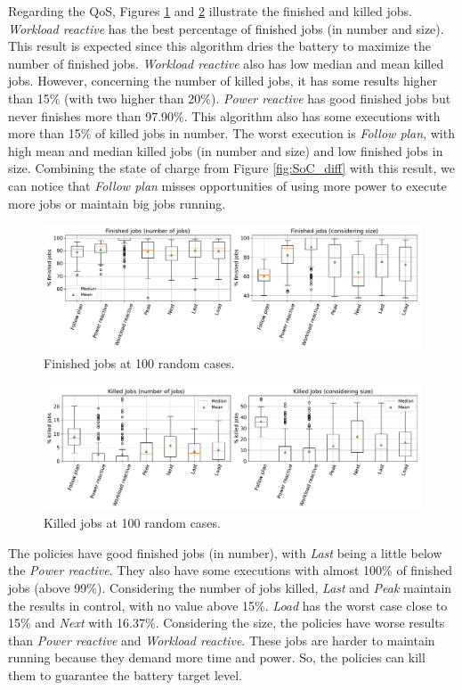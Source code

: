 Regarding the QoS, Figures \ref{fig:finished_diff} and \ref{fig:killed_diff} illustrate the finished and killed jobs. \emph{Workload reactive} has the best percentage of finished jobs (in number and size). This result is expected since this algorithm dries the battery to maximize the number of finished jobs. \emph{Workload reactive} also has low median and mean killed jobs. However, concerning the number of killed jobs, it has some results higher than 15\% (with two higher than 20\%). \emph{Power reactive} has good finished jobs but never finishes more than 97.90\%. This algorithm also has some executions with more than 15\% of killed jobs in number. The worst execution is \emph{Follow plan}, with high mean and median killed jobs (in number and size) and low finished jobs in size. Combining the state of charge from Figure \ref{fig:SoC_diff} with this result, we can notice that \emph{Follow plan} misses opportunities of using more power to execute more jobs or maintain big jobs running.

\begin{figure}[!htb]
    \centering
    \includegraphics[scale=0.38]{Images/Compensations/finished_diff.pdf}
    \caption{Finished jobs at 100 random cases.}
    \label{fig:finished_diff}
\end{figure}

\begin{figure}[!htb]
    \centering
    \includegraphics[scale=0.38]{Images/Compensations/killed_diff.pdf}
    \caption{Killed jobs at 100 random cases.}
    \label{fig:killed_diff}
\end{figure}

The policies have good finished jobs (in number), with \emph{Last} being a little below the \emph{Power reactive}. They also have some executions with almost 100\% of finished jobs (above 99\%). Considering the number of jobs killed, \emph{Last} and \emph{Peak} maintain the results in control, with no value above 15\%. \emph{Load} has the worst case close to 15\% and \emph{Next} with 16.37\%. Considering the size, the policies have worse results than \emph{Power reactive} and \emph{Workload reactive}. These jobs are harder to maintain running because they demand more time and power. So, the policies can kill them to guarantee the battery target level.

